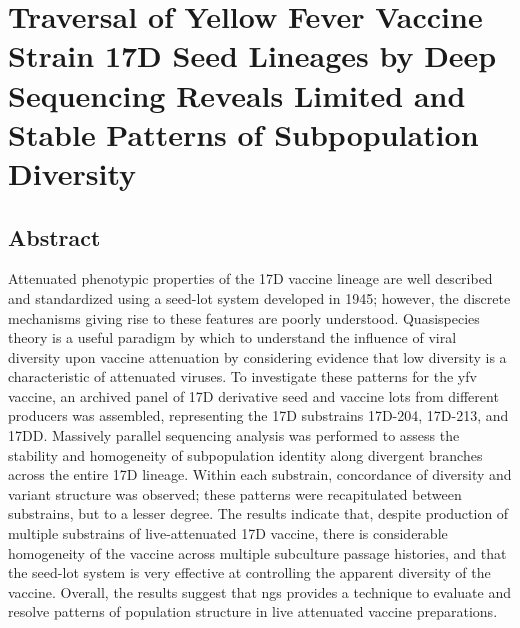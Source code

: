 
\chapter{Traversal of Yellow Fever Vaccine Strain 17D Seed Lineages by Deep Sequencing Reveals Limited and Stable Patterns of Subpopulation Diversity}

\section{Abstract}
Attenuated phenotypic properties of the 17D vaccine lineage are well described and standardized using a seed-lot system developed in 1945; however, the discrete mechanisms giving rise to these features are poorly understood. Quasispecies theory is a useful paradigm by which to understand the influence of viral diversity upon vaccine attenuation by considering evidence that low diversity is a characteristic of attenuated viruses. To investigate these patterns for the \gls{yfv} vaccine, an archived panel of 17D derivative seed and vaccine lots from different producers was assembled, representing the 17D substrains 17D-204, 17D-213, and 17DD. Massively parallel sequencing analysis was performed to assess the stability and homogeneity of subpopulation identity along divergent branches across the entire 17D lineage. Within each substrain, concordance of diversity and variant structure was observed; these patterns were recapitulated between substrains, but to a lesser degree. The results indicate that, despite production of multiple substrains of live-attenuated 17D vaccine, there is considerable homogeneity of the vaccine across multiple subculture passage histories, and that the seed-lot system is very effective at controlling the apparent diversity of the vaccine. Overall, the results suggest that \gls{ngs} provides a technique to evaluate and resolve patterns of population structure in live attenuated vaccine preparations.

